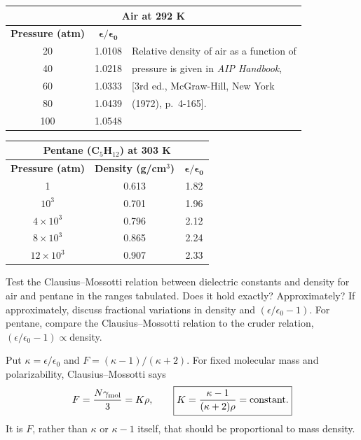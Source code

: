 \begin{center}
\begin{tabular}{c@{\hspace{4em}}c@{\hspace{4em}}l}
\multicolumn{3}{c}{\textbf{Air at 292 K}}\\[2pt]
\toprule
\textbf{Pressure (atm)} & $\boldsymbol{\epsilon/\epsilon_{0}}$ &\\
\midrule
20 & 1.0108 & Relative density of air as a function of\\
40 & 1.0218 & pressure is given in \emph{AIP Handbook},\\
60 & 1.0333 & [3rd ed., McGraw-Hill, New York\\
80 & 1.0439 & (1972), p.~4-165].\\
100 & 1.0548 &\\
\bottomrule
\end{tabular}
\end{center}

\begin{center}
\begin{tabular}{c@{\hspace{3em}}c@{\hspace{4em}}c}
\multicolumn{3}{c}{\textbf{Pentane (C$_{5}$H$_{12}$) at 303 K}}\\[2pt]
\toprule
\textbf{Pressure (atm)} & \textbf{Density (g/cm$^{3}$)} & $\boldsymbol{\epsilon/\epsilon_{0}}$\\
\midrule
1 & 0.613 & 1.82\\
$10^{3}$ & 0.701 & 1.96\\
$4\times10^{3}$ & 0.796 & 2.12\\
$8\times10^{3}$ & 0.865 & 2.24\\
$12\times10^{3}$ & 0.907 & 2.33\\
\bottomrule
\end{tabular}
\end{center}

Test the Clausius--Mossotti relation between dielectric constants and density for air and pentane in the ranges tabulated. Does it hold exactly? Approximately? If approximately, discuss fractional variations in density and $(\epsilon/\epsilon_{0}-1)$. For pentane, compare the Clausius--Mossotti relation to the cruder relation, $(\epsilon/\epsilon_{0}-1)\propto{}$density.
\solution

Put $\kappa=\epsilon/\epsilon_0$ and
$F=(\kappa-1)/(\kappa+2)$. For fixed molecular mass and polarizability,
Clausius--Mossotti says
\[
F=\frac{N\gamma_{\rm mol}}{3}=K\rho,\qquad
\boxed{K=\frac{\kappa-1}{(\kappa+2)\rho}=\text{constant}.}
\]
It is $F$, rather than $\kappa$ or $\kappa-1$ itself, that should be
proportional to mass density.

